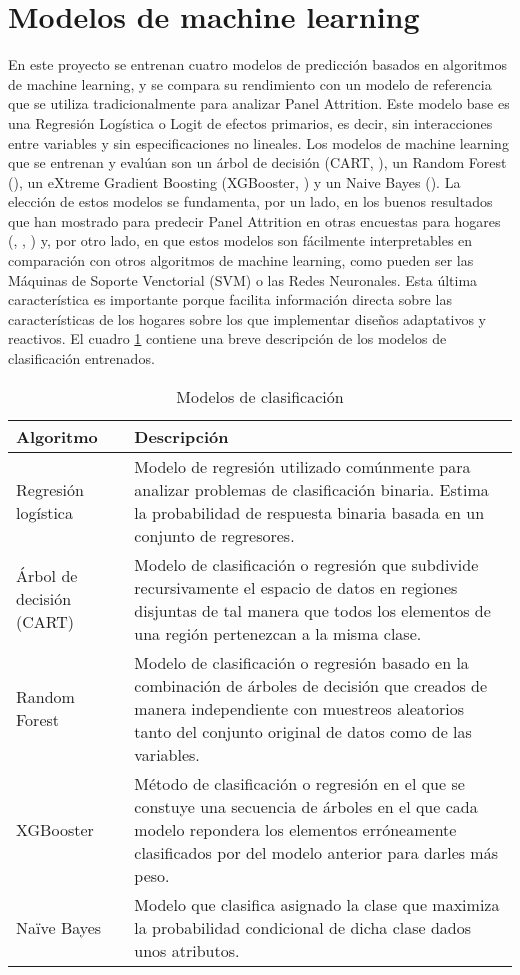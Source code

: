 \section{Modelos de machine learning}

En este proyecto se entrenan cuatro modelos de predicción basados en algoritmos de machine learning, y se compara su rendimiento con un modelo de referencia que se utiliza tradicionalmente para analizar Panel Attrition. Este modelo base es una Regresión Logística o Logit de efectos primarios, es decir, sin interacciones entre variables y sin especificaciones no lineales. Los modelos de machine learning que se entrenan y evalúan son un árbol de decisión (CART, \cite{breiman1984cart}), un Random Forest (\cite{breiman2001random}), un eXtreme Gradient Boosting (XGBooster, \cite{chen2016xgboost}) y un Naive Bayes (\cite{webb2010naive}). La elección de estos modelos se fundamenta, por un lado, en los buenos resultados que han mostrado para predecir Panel Attrition en otras encuestas para hogares (\cite{kern2019tree}, \cite{kern2021predicting}, \cite{beste2023case}) y, por otro lado, en que estos modelos son fácilmente interpretables en comparación con otros algoritmos de machine learning, como pueden ser las Máquinas de Soporte Venctorial (SVM) o las Redes Neuronales. Esta última característica es importante porque facilita información directa sobre las características de los hogares sobre los que implementar diseños adaptativos y reactivos. El cuadro \ref{table:classifiers} contiene una breve descripción de los modelos de clasificación entrenados.

\begin{table}[htbp]
\centering{}
\begin{tabular}{l p{10cm}}
\hline
\textbf{Algoritmo} & \textbf{Descripción} \\ \hline
Regresión logística & Modelo de regresión utilizado comúnmente para analizar problemas de clasificación binaria. Estima la probabilidad de respuesta binaria basada en un conjunto de regresores. \\ \hline
Árbol de decisión (CART) & Modelo de clasificación o regresión que subdivide recursivamente el espacio de datos en regiones disjuntas de tal manera que todos los elementos de una región pertenezcan a la misma clase. \\ \hline
Random Forest & Modelo de clasificación o regresión basado en la combinación  de árboles de decisión que creados de manera independiente con muestreos aleatorios tanto del conjunto original de datos como de las variables. \\ \hline
XGBooster & Método de clasificación o regresión en el que se constuye una secuencia de árboles en el que cada modelo repondera los elementos erróneamente clasificados por del modelo anterior para darles más peso. \\ \hline
Naïve Bayes & Modelo que clasifica asignado la clase que maximiza la probabilidad condicional de dicha clase dados unos atributos. \\ \hline
\end{tabular}
\caption{Modelos de clasificación}
\label{table:classifiers}
\end{table}

